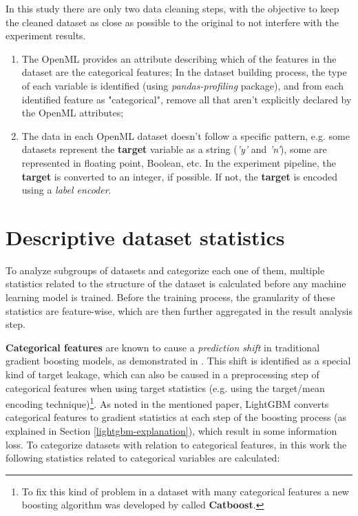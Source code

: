 In this study there are only two data cleaning steps, with the objective to keep the cleaned dataset as close as possible to the original to not interfere with the experiment results.
\begin{enumerate}
    \item The OpenML provides an attribute describing which of the features in the dataset are the categorical features; In the dataset building process, the type of each variable is identified (using \textit{pandas-profiling} package), and from each identified feature as "categorical", remove all that aren't explicitly declared by the OpenML attributes;
    \item The data in each OpenML dataset doesn't follow a specific pattern, e.g. some datasets represent the \textbf{target} variable as a string (\textit{'y'} and \textit{'n'}), some are represented in floating point, Boolean, etc. In the experiment pipeline, the \textbf{target} is converted to an integer, if possible. If not, the \textbf{target} is encoded using a \textit{label encoder}.
\end{enumerate}

\section{Descriptive dataset statistics}
\label{dataset-aggregated-statistics}

To analyze subgroups of datasets and categorize each one of them, multiple statistics related to the structure of the dataset is calculated before any machine learning model is trained. Before the training process, the granularity of these statistics are feature-wise, which are then further aggregated in the result analysis step.

\textbf{Categorical features} are known to cause a \textit{prediction shift} in traditional gradient boosting models, as demonstrated in \cite{prokhorenkova2018catboost}. This shift is identified as a special kind of target leakage, which can also be caused in a preprocessing step of categorical features when using target statistics (e.g. using the target/mean encoding technique)\footnote{To fix this kind of problem in a dataset with many categorical features a new boosting algorithm was developed by \cite{dorogush2018catboost} called \textbf{Catboost}.}. As noted in the mentioned paper, LightGBM converts categorical features to gradient statistics at each step of the boosting process (as explained in Section \ref{lightgbm-explanation}), which result in some information loss. To categorize datasets with relation to categorical features, in this work the following statistics related to categorical variables are calculated:

